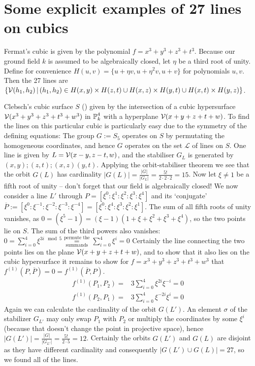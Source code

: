 \section{Some explicit examples of 27 lines on cubics}

\begin{example}
Fermat's cubic is given by the polynomial $f = x^3 + y^3 + z^3 + t^3$.
Because our ground field $k$ is assumed to be algebraically closed, let $\eta$ be a third root of unity.
Define for convenience $H(u,v) = \{ u+\eta v, u+\eta^2v, u+v \}$ for polynomials $u,v$.
Then the 27 lines are
$\left\lbrace \operatorname{\mathcal V}(h_1,h_2) \,|\,  (h_1,h_2) \in H(x,y)\times H(z,t) \cup H(x,z)\times H(y,t) \cup H(x,t)\times H(y,z)\right\rbrace$.
\end{example}

\begin{example}
Clebsch's cubic surface $S$ (\cite[§16,p.331 ff.]{clebsch1871ueber}) given by the intersection of a cubic hypersurface $\operatorname{\mathcal V}(x^3 + y^3 + z^3 + t^3 + w^3)$ in $\operatorname{\mathbb P}^4_k$ with a hyperplane $\operatorname{\mathcal V}(x+y+z+t+w)$.
To find the lines on this particular cubic is particularly easy due to the symmetry of the defining equations: The group $G := S_5$ operates on $S$ by permutating the homogeneous coordinates, and hence $G$ operates on the set $\mathcal L$ of lines on $S$.
One line is given by $L = \operatorname{\mathcal V}(x-y,z-t,w)$, and the stabiliser $G_L$ is generated by $(x,y);(z,t);(x,z)(y,t)$.
Applying the orbit-stabiliser theorem we see that the orbit $G(L)$ has cardinality $|G(L)| = \frac{|G|}{|G_L|} = \frac{5!}{2\cdot2\cdot2} = 15$.
Now let $\xi \neq 1$ be a fifth root of unity -- don't forget that our field is algebraically closed!
We now consider a line $L'$ through $P = [\xi^0:\xi^1:\xi^2:\xi^3:\xi^4]$ and its `conjugate' $\overline{P} := [\xi^0:\xi^{-1}:\xi^{-2}:\xi^{-3}:\xi^{-4}] = [\xi^0:\xi^4:\xi^3:\xi^2:\xi^1]$.
The sum of all fifth roots of unity vanishes, as $0 = (\xi^5 - 1) = (\xi - 1)(1 + \xi + \xi^2+\xi^3+\xi^4)$, so the two points lie on $S$.
The sum of the third powers also vanishes: $0 = \sum_{i=0}^4 \xi^{3i \mod 5} \overset{\text{permute the}}{\underset{\text{summands}}=} \sum_{i=0}^4 \xi^i = 0$
Certainly the line connecting the two points lies on the plane $\operatorname{\mathcal V}(x+y+z+t+w)$, and to show that it also lies on the cubic hypersurface it remains to show for $f = x^3 + y^3 + z^3 + t^3 + w^3$ that $f^{(1)}(P,\overline P) = 0 = f^{(1)}(\overline P,P)$.
\begin{align}
f^{(1)}(P_1,P_2) =& 3 \sum_{i=0}^4 \xi^{2i}\xi^{-i} = 0 \\
f^{(1)}(P_2,P_1) =& 3 \sum_{i=0}^4 \xi^{-2i}\xi^{i} = 0
\end{align}
Again we can calculate the cardinality of the orbit $G(L')$.
An element $\sigma$ of the stabilizer $G_{L'}$ may only swap $P_1$ with $P_2$ or multiply the coordinates by some $\xi^i$ (because that doesn't change the point in projective space), hence $|G(L')| = \frac{|G|}{|G_{L'}|} = \frac{5!}{2\cdot 5} = 12$.
Certainly the orbits $G(L')$ and $G(L)$ are disjoint as they have different cardinality and consequently $|G(L') \cup G(L)| = 27$, so we found all of the lines.
\end{example}
